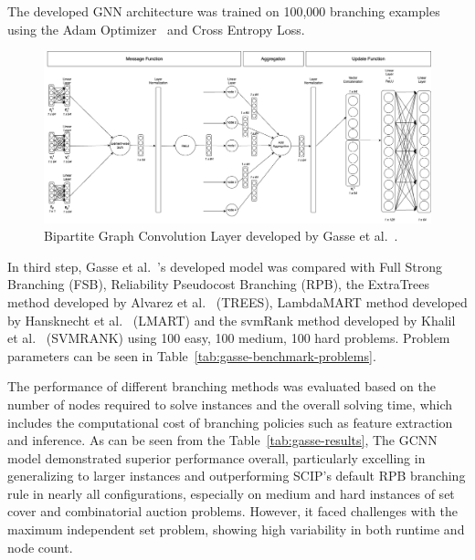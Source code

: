 The developed GNN architecture was trained on 100,000 branching examples using the Adam Optimizer~\cite{kingmaAdamMethodStochastic2017} and Cross Entropy Loss.

\begin{figure}[htb!]
    \centering
    \includegraphics[width=1\textwidth]{figures/Convolution}
    \caption{Bipartite Graph Convolution Layer developed by Gasse et al.~\cite{gasseExactCombinatorialOptimization2019}.}
    \label{fig:convolution}
\end{figure}


In third step, Gasse et al.~\cite{gasseExactCombinatorialOptimization2019}'s developed model was compared with Full Strong Branching (FSB), Reliability Pseudocost Branching (RPB), the ExtraTrees method developed by Alvarez et al.~\cite{alvarezMachineLearningBasedApproximation2017} (TREES), LambdaMART method developed by Hansknecht et al.~\cite{hansknechtCutsPrimalHeuristics2018a} (LMART) and the svmRank method developed by Khalil et al.~\cite{khalilLearningBranchMixed2016} (SVMRANK) using 100 easy, 100 medium, 100 hard problems.
Problem parameters can be seen in Table~\ref{tab:gasse-benchmark-problems}.




The performance of different branching methods was evaluated based on the number of nodes required to solve instances and the overall solving time, which includes the computational cost of branching policies such as feature extraction and inference.
As can be seen from the Table~\ref{tab:gasse-results}, The GCNN model demonstrated superior performance overall, particularly excelling in generalizing to larger instances and outperforming SCIP's default RPB branching rule in nearly all configurations, especially on medium and hard instances of set cover and combinatorial auction problems.
However, it faced challenges with the maximum independent set problem, showing high variability in both runtime and node count.


